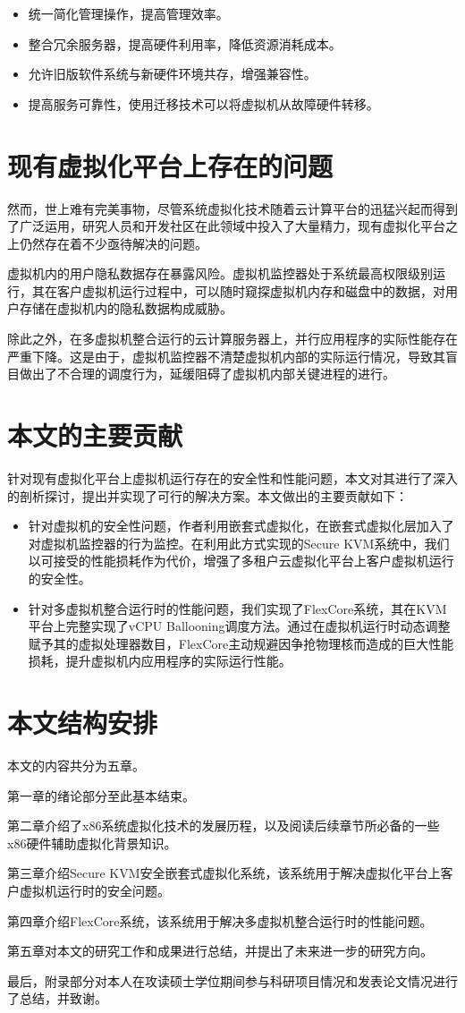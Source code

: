 \begin{itemize}
\item 统一简化管理操作，提高管理效率。
\item 整合冗余服务器，提高硬件利用率，降低资源消耗成本。
\item 允许旧版软件系统与新硬件环境共存，增强兼容性。
\item 提高服务可靠性，使用迁移技术可以将虚拟机从故障硬件转移。
\end{itemize}

\section{现有虚拟化平台上存在的问题}

然而，世上难有完美事物，尽管系统虚拟化技术随着云计算平台的迅猛兴起而得到了广泛运用，研究人员和开发社区在此领域中投入了大量精力，现有虚拟化平台之上仍然存在着不少亟待解决的问题。

虚拟机内的用户隐私数据存在暴露风险。虚拟机监控器处于系统最高权限级别运行，其在客户虚拟机运行过程中，可以随时窥探虚拟机内存和磁盘中的数据，对用户存储在虚拟机内的隐私数据构成威胁。

除此之外，在多虚拟机整合运行的云计算服务器上，并行应用程序的实际性能存在严重下降。这是由于，虚拟机监控器不清楚虚拟机内部的实际运行情况，导致其盲目做出了不合理的调度行为，延缓阻碍了虚拟机内部关键进程的进行。

\section{本文的主要贡献}

针对现有虚拟化平台上虚拟机运行存在的安全性和性能问题，本文对其进行了深入的剖析探讨，提出并实现了可行的解决方案。本文做出的主要贡献如下：

\begin{itemize}
\item 针对虚拟机的安全性问题，作者利用嵌套式虚拟化，在嵌套式虚拟化层加入了对虚拟机监控器的行为监控。在利用此方式实现的Secure KVM系统中，我们以可接受的性能损耗作为代价，增强了多租户云虚拟化平台上客户虚拟机运行的安全性。
\item 针对多虚拟机整合运行时的性能问题，我们实现了FlexCore系统，其在KVM平台上完整实现了vCPU Ballooning调度方法。通过在虚拟机运行时动态调整赋予其的虚拟处理器数目，FlexCore主动规避因争抢物理核而造成的巨大性能损耗，提升虚拟机内应用程序的实际运行性能。
\end{itemize}

\section{本文结构安排}

本文的内容共分为五章。

第一章的绪论部分至此基本结束。

第二章介绍了x86系统虚拟化技术的发展历程，以及阅读后续章节所必备的一些x86硬件辅助虚拟化背景知识。

第三章介绍Secure KVM安全嵌套式虚拟化系统，该系统用于解决虚拟化平台上客户虚拟机运行时的安全问题。

第四章介绍FlexCore系统，该系统用于解决多虚拟机整合运行时的性能问题。

第五章对本文的研究工作和成果进行总结，并提出了未来进一步的研究方向。

最后，附录部分对本人在攻读硕士学位期间参与科研项目情况和发表论文情况进行了总结，并致谢。



